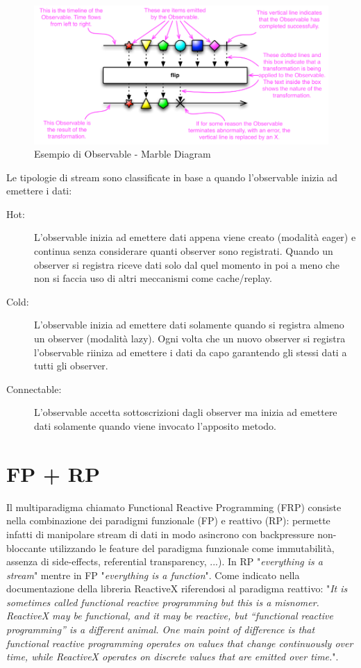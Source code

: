 \documentclass[../main.tex]{subfiles}
\begin{document}
\begin{figure}[H]
\centering
\includegraphics[width=1\textwidth]{img/observable1.png}
\caption{Esempio di Observable - Marble Diagram}
\end{figure}

Le tipologie di stream sono classificate in base a quando l'observable inizia ad emettere i dati:
\begin{description}
    \item[Hot:] L'observable inizia ad emettere dati appena viene creato (modalità eager) e continua senza considerare quanti observer sono registrati. Quando un observer si registra riceve dati solo dal quel momento in poi a meno che non si faccia uso di altri meccanismi come cache/replay.
    \item[Cold:] L'observable inizia ad emettere dati solamente quando si registra almeno un observer (modalità lazy). Ogni volta che un nuovo observer si registra l'observable riiniza ad emettere i dati da capo garantendo gli stessi dati a tutti gli observer.
    \item[Connectable:] L'observable accetta sottoscrizioni dagli observer ma inizia ad emettere dati solamente quando viene invocato l'apposito metodo.
\end{description}

\section{FP + RP}
Il multiparadigma chiamato Functional Reactive Programming (FRP) consiste nella combinazione dei paradigmi funzionale (FP) e reattivo (RP): permette infatti di manipolare stream di dati in modo asincrono con backpressure non-bloccante utilizzando le feature del paradigma funzionale come immutabilità, assenza di side-effects, referential transparency, ...). In RP "\textit{everything is a stream}" mentre in FP "\textit{everything is a function}". Come indicato nella documentazione \cite{frp8} della libreria ReactiveX riferendosi al paradigma reattivo: "\textit{It is sometimes called functional reactive programming but this is a misnomer. ReactiveX may be functional, and it may be reactive, but “functional reactive programming” is a different animal. One main point of difference is that functional reactive programming operates on values that change continuously over time, while ReactiveX operates on discrete values that are emitted over time.}".
\end{document}
